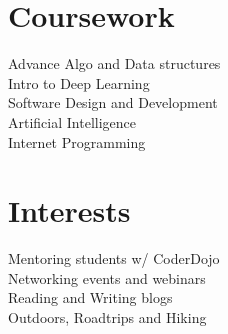 \documentclass[]{rinkal_resume}
\begin{document}
\begin{minipage}[t]{0.30\textwidth}
\sectionsep

\section{Coursework}
Advance Algo and Data structures \\
Intro to Deep Learning \\
Software Design and Development \\
Artificial Intelligence \\
Internet Programming \\
\sectionsep

\section{Interests}
\textbullet{} Mentoring students w/ CoderDojo \\
\textbullet{} Networking events and webinars \\
\textbullet{} Reading and Writing blogs \\
\textbullet{} Outdoors, Roadtrips and Hiking \\
%
%

\end{minipage} 
\hfill
\end{document}
